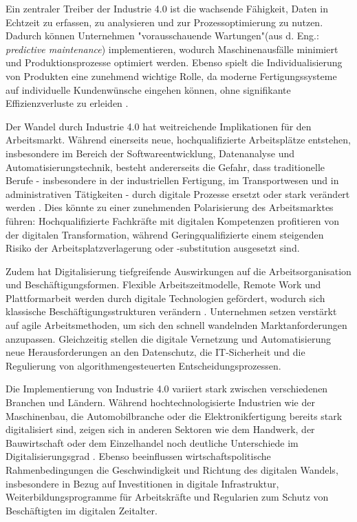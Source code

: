 Ein zentraler Treiber der Industrie 4.0 ist die wachsende Fähigkeit, Daten in Echtzeit zu 
erfassen, zu analysieren und zur Prozessoptimierung zu nutzen. Dadurch können Unternehmen 
"vorausschauende Wartungen"(aus d. Eng.: \textit{predictive maintenance}) implementieren, 
wodurch Maschinenausfälle minimiert und Produktionsprozesse optimiert werden. Ebenso 
spielt die Individualisierung von Produkten eine zunehmend wichtige Rolle, da moderne 
Fertigungssysteme auf individuelle Kundenwünsche eingehen können, ohne signifikante 
Effizienzverluste zu erleiden \parencite[S. 85]{bartodziej2016theconcept}.

Der Wandel durch Industrie 4.0 hat weitreichende Implikationen für den Arbeitsmarkt. 
Während einerseits neue, hochqualifizierte Arbeitsplätze entstehen, insbesondere im Bereich 
der Softwareentwicklung, Datenanalyse und Automatisierungstechnik, besteht andererseits 
die Gefahr, dass traditionelle Berufe - insbesondere in der industriellen Fertigung, im 
Transportwesen und in administrativen Tätigkeiten - durch digitale Prozesse ersetzt oder 
stark verändert werden \parencite[S. 40]{frey2016thefuture}. Dies könnte zu einer 
zunehmenden Polarisierung des Arbeitsmarktes führen: Hochqualifizierte Fachkräfte mit digitalen 
Kompetenzen profitieren von der digitalen Transformation, während Geringqualifizierte 
einem steigenden Risiko der Arbeitsplatzverlagerung oder -substitution ausgesetzt sind.

Zudem hat Digitalisierung tiefgreifende Auswirkungen auf die Arbeitsorganisation und 
Beschäftigungsformen. Flexible Arbeitszeitmodelle, Remote Work und Plattformarbeit werden 
durch digitale Technologien gefördert, wodurch sich klassische Beschäftigungsstrukturen 
verändern \parencite[S. 112]{schwab2016thefourth}. Unternehmen setzen verstärkt auf agile 
Arbeitsmethoden, um sich den schnell wandelnden Marktanforderungen anzupassen. 
Gleichzeitig stellen die digitale Vernetzung und Automatisierung neue Herausforderungen 
an den Datenschutz, die IT-Sicherheit und die Regulierung von algorithmengesteuerten 
Entscheidungsprozessen.

Die Implementierung von Industrie 4.0 variiert stark zwischen verschiedenen Branchen und 
Ländern. Während hochtechnologisierte Industrien wie der Maschinenbau, die 
Automobilbranche oder die Elektronikfertigung bereits stark digitalisiert sind, zeigen 
sich in anderen Sektoren wie dem Handwerk, der Bauwirtschaft oder dem Einzelhandel noch 
deutliche Unterschiede im Digitalisierungsgrad 
\parencite[S. 77]{brennen2016theinternational}. Ebenso beeinflussen wirtschaftspolitische 
Rahmenbedingungen die Geschwindigkeit und Richtung des digitalen Wandels, insbesondere in 
Bezug auf Investitionen in digitale Infrastruktur, Weiterbildungsprogramme für 
Arbeitskräfte und Regularien zum Schutz von Beschäftigten im digitalen Zeitalter.

